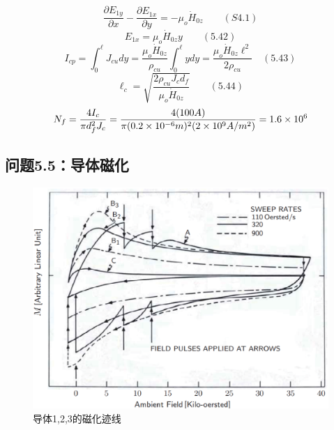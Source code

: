 \begin{equation}%
\frac{\partial E_{1y}}{\partial x}-\frac{\partial E_{1x}}{\partial y}=-\mu_{o}\dot{H}_{0z}\qquad(S4.1)
\end{equation}
\begin{equation}%
E_{1x}=\mu_{o}\dot{H}_{0z}y\qquad(5.42)
\end{equation}
\begin{equation}%
I_{cp}=\int_{0}^{\ell}J_{cu}dy=\frac{\mu_{o}\dot{H}_{0z}}{\rho_{cu}}\int_{0}^{\ell}ydy=\frac{\mu_{o}\dot{H}_{0z}\ell^{2}}{2\rho_{cu}}\quad(5.43)
\end{equation}
\begin{equation}%
\ell_{c}=\sqrt{\frac{2\rho_{cu}J_{c}d_{f}}{\mu_{o}\dot{H}_{0z}}}\qquad(5.44)
\end{equation}
\begin{equation}%
N_{f}=\frac{4I_{c}}{\pi d_{f}^{2}J_{c}}=\frac{4(100A)}{\pi(0.2\times10^{-6}m)^{2}(2\times10^{9}A/m^{2})}\\
=1.6\times10^{6}
\end{equation}


\subsection{问题5.5：导体磁化}




\begin{figure}
	\centering
	\includegraphics[scale=0.8]{chpt5/figs/fig5.21.eps}
	\caption{导体1,2,3的磁化迹线}
\end{figure}


